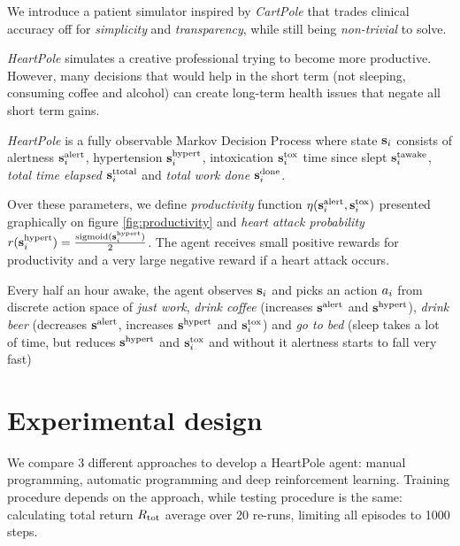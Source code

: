 We introduce a patient simulator inspired by \emph{CartPole} \cite{cartpole} that trades clinical accuracy off for \emph{simplicity} and \emph{transparency}, while still being \emph{non-trivial} to solve.

\emph{HeartPole} simulates a creative professional trying to become more productive.
However, many decisions that would help in the short term (not sleeping, consuming coffee and alcohol) can create long-term health issues that negate all short term gains.

\emph{HeartPole} is a fully observable Markov Decision Process \cite{mdp} where state $\textbf{s}_i$ consists of alertness $\textbf{s}^\text{alert}_i$, hypertension $\textbf{s}^\text{hypert}_i$, intoxication $\textbf{s}^\text{tox}_i$ time since slept $\textbf{s}^\text{tawake}_i$, \emph{total time elapsed} $\textbf{s}^\text{ttotal}_i$ and \emph{total work done} $\textbf{s}^\text{done}_i$.

Over these parameters, we define \emph{productivity} function $\eta(\textbf{s}^\text{alert}_i, \textbf{s}^\text{tox}_i)$ presented graphically on figure \ref{fig:productivity} and \emph{heart attack probability} $r(\textbf{s}^\text{hypert}_i)=\frac{\text{sigmoid}(\textbf{s}^\text{hypert}_i)}{2}$.
The agent receives small positive rewards for productivity and a very large negative reward if a heart attack occurs.

Every half an hour awake, the agent observes $\textbf{s}_i$ and picks an action $a_i$ from discrete action space of \emph{just work}, \emph{drink coffee} (increases $\textbf{s}^\text{alert}$ and $\textbf{s}^\text{hypert}$), \emph{drink beer} (decreases $\textbf{s}^\text{alert}$, increases $\textbf{s}^\text{hypert}$ and $\textbf{s}^\text{tox}_i$) and \emph{go to bed} (sleep takes a lot of time, but reduces $\textbf{s}^\text{hypert}$ and $\textbf{s}^\text{tox}_i$ and without it alertness starts to fall very fast)

\newpage
\section{Experimental design}
\label{sec:heartpole-experiments}

We compare 3 different approaches to develop a HeartPole agent: manual programming, automatic programming and deep reinforcement learning.
Training procedure depends on the approach, while testing procedure is the same: calculating total return $R_\text{tot}$ average over 20 re-runs, limiting all episodes to 1000 steps.


